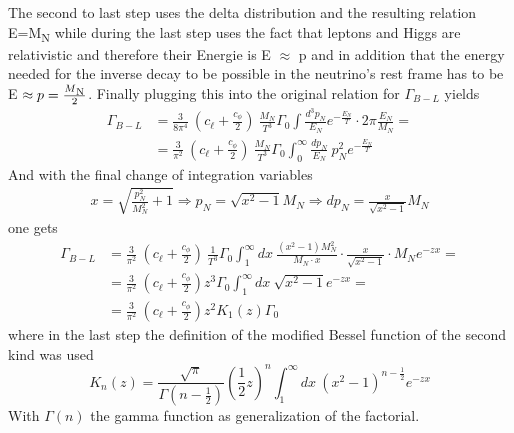 The second to last step uses the delta distribution and the resulting relation E=M\textsubscript{N} while during the last step uses the fact that leptons and Higgs are relativistic and therefore their Energie is E $\approx$ p and in addition that the energy needed for the inverse decay to be possible in the neutrino's rest frame has to be E $\approx p=\frac{M\textsubscript{N}}{2}$. Finally plugging this into the original relation for $\Gamma_{B-L}$ yields
\begin{align*}
	\Gamma_{B-L}&=\frac{3}{8\pi^4}\:\left(c_\ell+\frac{c_\phi}{2}\right)\:\frac{M_N}{T^3}\Gamma_0\int \frac{d^3p_N}{E_N}e^{-\frac{E_N}{T}} \cdot 2\pi\frac{E_N}{M_N}=\\
	&=\frac{3}{\pi^2}\:\left(c_\ell+\frac{c_\phi}{2}\right)\:\frac{M_N}{T^3}\Gamma_0\int_0^\infty \frac{dp_N}{E_N}\:p_N^2e^{-\frac{E_N}{T}}
\end{align*}
And with the final change of integration variables 
\begin{align*}
	x=\sqrt{\frac{p_N^2}{M_N^2}+1}\Longrightarrow p_N=\sqrt{x^2-1}M_N \Longrightarrow dp_N=\frac{x}{\sqrt{x^2-1}}M_N
\end{align*}
one gets 
\begin{align*}
	\Gamma_{B-L}&=\frac{3}{\pi^2}\:\left(c_\ell+\frac{c_\phi}{2}\right)\:\frac{1}{T^3}\Gamma_0\int_{1}^{\infty}dx\: \frac{\left(x^2-1 \right)M_N^2}{M_N\cdot x}\cdot \frac{x}{\sqrt{x^2-1}}\cdot M_N e^{-zx}=\\
	&=\frac{3}{\pi^2}\:\left(c_\ell+\frac{c_\phi}{2}\right)z^3\Gamma_0\int_{1}^{\infty}dx\: \sqrt{x^2-1}e^{-zx}=\\
	&=\frac{3}{\pi^2}\:\left(c_\ell+\frac{c_\phi}{2}\right)z^2K_1(z)\Gamma_0
\end{align*}
where in the last step the definition of the modified Bessel function of the second kind was used
\begin{equation*}
	K_n(z)=\frac{\sqrt{\pi}}{\Gamma\left(n-\frac{1}{2}\right)}\left(\frac{1}{2}z\right)^n\int_{1}^{\infty}dx\:\left(x^2-1\right)^{n-\frac{1}{2}}e^{-zx}
\end{equation*}
With $\Gamma(n)$ the gamma function as generalization of the factorial. 